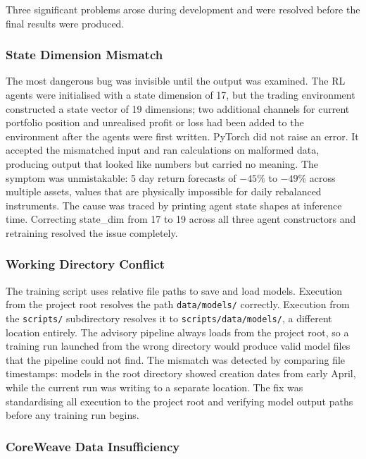 \documentclass[journal]{IEEEtran}
\begin{document}
Three significant problems arose during development and were resolved
before the final results were produced.

\subsubsection{State Dimension Mismatch}

The most dangerous bug was invisible until the output was examined. The
RL agents were initialised with a state dimension of 17, but the trading
environment constructed a state vector of 19 dimensions; two additional
channels for current portfolio position and unrealised profit or loss had
been added to the environment after the agents were first written. PyTorch
did not raise an error. It accepted the mismatched input and ran
calculations on malformed data, producing output that looked like numbers
but carried no meaning. The symptom was unmistakable: 5 day return
forecasts of $-45\%$ to $-49\%$ across multiple assets, values that are
physically impossible for daily rebalanced instruments. The cause was
traced by printing agent state shapes at inference time. Correcting
state\_dim from 17 to 19 across all three agent constructors and
retraining resolved the issue completely.

\subsubsection{Working Directory Conflict}

The training script uses relative file paths to save and load models.
Execution from the project root resolves the path \texttt{data/models/}
correctly. Execution from the \texttt{scripts/} subdirectory resolves it
to \texttt{scripts/data/models/}, a different location entirely. The
advisory pipeline always loads from the project root, so a training run
launched from the wrong directory would produce valid model files that
the pipeline could not find. The mismatch was detected by comparing file
timestamps: models in the root directory showed creation dates from early
April, while the current run was writing to a separate location. The fix
was standardising all execution to the project root and verifying model
output paths before any training run begins.

\subsubsection{CoreWeave Data Insufficiency}
\end{document}
